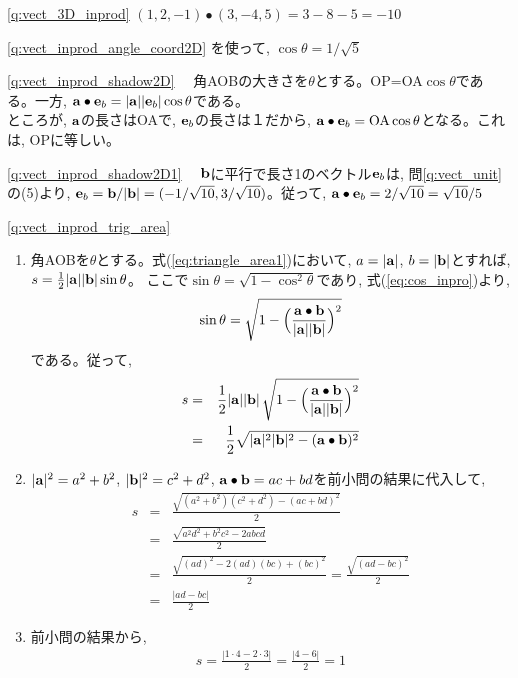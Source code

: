 %
\ref{q:vect_3D_inprod} 
$(1, 2, -1)\bullet(3, -4, 5)=3-8-5=-10$\hv

\ref{q:vect_inprod_angle_coord2D}  
を使って, $\cos\theta=1/\sqrt{5}$
\hv

\ref{q:vect_inprod_shadow2D}
　角AOBの大きさを$\theta$とする。OP=OA$\cos\theta$である。一方, 
${\bf a}\bullet{\bf e}_b=|{\bf a}||{\bf e}_b|\cos\theta$である。\\
ところが, ${\bf a}$の長さはOAで, ${\bf e}_b$の長さは１だから, 
${\bf a}\bullet{\bf e}_b=\text{OA}\cos\theta$となる。これは, OPに等しい。
\hv

\ref{q:vect_inprod_shadow2D1}　
${\bf b}$に平行で長さ1のベクトル${\bf e}_b$は, 問\ref{q:vect_unit} の(5)より, 
${\bf e}_b={\bf b}/|{\bf b}|=(-1/\sqrt{10}, 3/\sqrt{10})$。従って, 
${\bf a}\bullet{\bf e}_b=2/\sqrt{10}=\sqrt{10}/5$
\hv

\ref{q:vect_inprod_trig_area}  
\begin{enumerate}
\item 角AOBを$\theta$とする。式(\ref{eq:triangle_area1})において, $a=|{\bf a}|$, $b=|{\bf b}|$とすれば, 
$s=\frac{1}{2}|{\bf a}||{\bf b}|\sin\theta$。
ここで$\sin\theta=\sqrt{1-\cos^2\theta}$であり, 式(\ref{eq:cos_inpro})より, 
\begin{eqnarray*}
\sin\theta=\sqrt{1-\Bigl(\frac{{\bf a}\bullet{\bf b}}{|{\bf a}||{\bf b}|}\Bigr)^2}
\end{eqnarray*}
である。従って, 
\begin{eqnarray*}
s&=&\frac{1}{2}|{\bf a}||{\bf b}|\,\sqrt{1-\Bigl(\frac{{\bf a}\bullet{\bf b}}{|{\bf a}||{\bf b}|}\Bigr)^2}\\
&=&\frac{1}{2}\sqrt{|{\bf a}|^2|{\bf b}|^2-({\bf a}\bullet{\bf b})^2}
\end{eqnarray*}
\item $|{\bf a}|^2=a^2+b^2$, $|{\bf b}|^2=c^2+d^2$, ${\bf a}\bullet{\bf b}=ac+bd$を前小問の結果に代入して, 
\begin{eqnarray*}
s&=&\frac{\sqrt{(a^2+b^2)(c^2+d^2)-(ac+bd)^2}}{2}\\
&=&\frac{\sqrt{a^2d^2+b^2c^2-2abcd}}{2}\\
&=&\frac{\sqrt{(ad)^2-2(ad)(bc)+(bc)^2}}{2}=\frac{\sqrt{(ad-bc)^2}}{2}\\
&=&\frac{|ad-bc|}{2}
\end{eqnarray*}
\item 前小問の結果から, 
\begin{eqnarray*}
s=\frac{|1\cdot4-2\cdot3|}{2}=\frac{|4-6|}{2}=1
\end{eqnarray*}
\end{enumerate}
\hv


